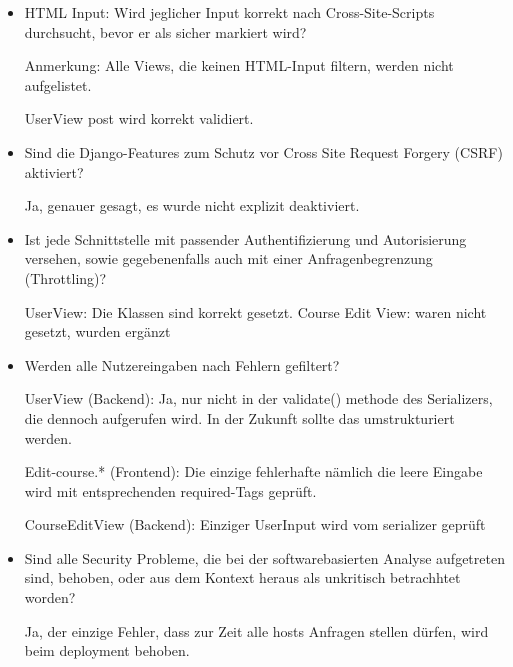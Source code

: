 \begin{itemize}


\item HTML Input: Wird jeglicher Input korrekt nach Cross-Site-Scripts durchsucht, bevor er als sicher markiert wird?

Anmerkung: Alle Views, die keinen HTML-Input filtern, werden nicht aufgelistet.

UserView post wird korrekt validiert.

\item Sind die Django-Features zum Schutz vor Cross Site Request Forgery (CSRF) aktiviert?

Ja, genauer gesagt, es wurde nicht explizit deaktiviert.


\item Ist jede Schnittstelle mit passender Authentifizierung und Autorisierung versehen, sowie gegebenenfalls auch mit einer Anfragenbegrenzung (Throttling)?

UserView: Die Klassen sind korrekt gesetzt.
Course Edit View: waren nicht gesetzt, wurden ergänzt


\item Werden alle Nutzereingaben nach Fehlern gefiltert?

UserView (Backend): Ja, nur nicht in der validate() methode des Serializers, die dennoch aufgerufen wird. In der Zukunft sollte das umstrukturiert werden.

Edit-course.* (Frontend):
Die einzige fehlerhafte nämlich die leere Eingabe wird mit entsprechenden required-Tags geprüft.

CourseEditView (Backend): Einziger UserInput wird vom serializer geprüft

\item Sind alle Security Probleme, die bei der softwarebasierten Analyse aufgetreten sind, behoben, oder aus dem Kontext heraus als unkritisch betrachhtet worden?

Ja, der einzige Fehler, dass zur Zeit alle hosts Anfragen stellen dürfen, wird beim deployment behoben.

\end{itemize}

